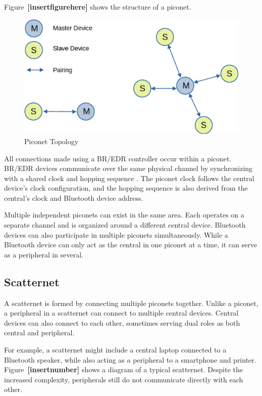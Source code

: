 Figure~\textbf{[insertfigurehere]} shows the structure of a piconet.

\begin{figure}[h]
    \caption{Piconet Topology}
    \includegraphics{piconet.png}
    \end{figure}

All connections made using a BR/EDR controller occur within a piconet. BR/EDR devices communicate over the same physical channel by synchronizing with a shared clock and hopping sequence \cite{bluetoothcorespec6}. The piconet clock follows the central device's clock configuration, and the hopping sequence is also derived from the central’s clock and Bluetooth device address.

Multiple independent piconets can exist in the same area. Each operates on a separate channel and is organized around a different central device. Bluetooth devices can also participate in multiple piconets simultaneously. While a Bluetooth device can only act as the central in one piconet at a time, it can serve as a peripheral in several.


\subsection{Scatternet}

A scatternet is formed by connecting multiple piconets together. Unlike a piconet, a peripheral in a scatternet can connect to multiple central devices. Central devices can also connect to each other, sometimes serving dual roles as both central and peripheral.

For example, a scatternet might include a central laptop connected to a Bluetooth speaker, while also acting as a peripheral to a smartphone and printer. Figure~\textbf{[insertnumber]} shows a diagram of a typical scatternet. Despite the increased complexity, peripherals still do not communicate directly with each other.

